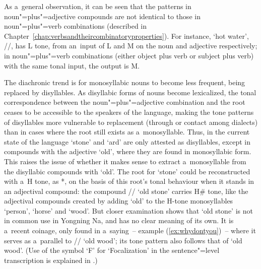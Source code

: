 As a~general observation, it can be seen that the patterns in noun"=plus"=adjective compounds are not identical to those in noun"=plus"=verb combinations (described in Chapter~\ref{chap:verbsandtheircombinatoryproperties}). For instance, ‘hot water’, //, has L tone, from an~input of L and M on the noun and adjective respectively; in noun"=plus"=verb combinations (either object plus verb or subject plus verb) with the same tonal input, the output is M.

The {diachronic} trend is for monosyllabic nouns to become less frequent, being replaced by disyllables. As disyllabic forms of nouns become lexicalized, the tonal {correspondence} between the noun"=plus"=adjective combination and the root ceases to be accessible to the speakers of the language, making the tone patterns of disyllables more vulnerable to replacement (through  or contact among dialects) than in cases where the root still exists as a~{monosyllable}. Thus, in the current state of the language ‘stone’ and ‘ard’ are only attested as disyllables, except in compounds with the adjective ‘old’, where they are found in monosyllabic form. This raises the issue of whether it makes sense to extract a~{monosyllable} from the disyllabic compounds with ‘old’. The root for ‘stone’ could be reconstructed with a~H tone, as *, on the basis of this root's tonal behaviour when it stands in an adjectival compound: the compound // ‘old stone’ carries H\# tone, like the adjectival compounds created by adding ‘old’ to the H-tone monosyllables ‘person’, ‘horse’ and ‘wood’. But closer examination shows that ‘old stone’ is not in common use in Yongning Na, and has no clear meaning of its own. It is a~recent coinage, only found in a~saying~-- example (\ref{ex:whydontyou})~-- where it serves as a~parallel to // ‘old wood’; its tone pattern also follows that of ‘old wood’. (Use of the symbol ‘F’ for ‘Focalization’ in the sentence"=level transcription is explained in .)

